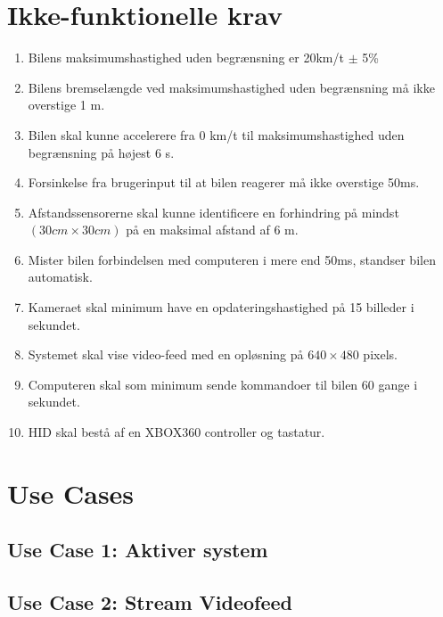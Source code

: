 \section{Ikke-funktionelle krav}
\begin{enumerate}
	\item Bilens maksimumshastighed uden begrænsning er 20km/t $\pm$ 5\% %
	\item Bilens bremselængde ved maksimumshastighed uden begrænsning må ikke overstige 1 m. %
	\item Bilen skal kunne accelerere fra 0 km/t til maksimumshastighed uden begrænsning på højest 6 s. %
	\item Forsinkelse fra brugerinput til at bilen reagerer må ikke overstige 50ms. %
	\item Afstandssensorerne skal kunne identificere en forhindring på mindst $(30cm \times 30cm)$ på en maksimal afstand af 6 m. %
	\item Mister bilen forbindelsen med computeren i mere end 50ms, standser bilen automatisk. 
	\item Kameraet skal minimum have en opdateringshastighed på 15 billeder i sekundet. %
	\item Systemet skal vise video-feed med en opløsning på $640 \times 480$ pixels.
	\item Computeren skal som minimum sende kommandoer til bilen 60 gange i sekundet. 
	\item HID skal bestå af en XBOX360 controller og tastatur.
\end{enumerate}

\newpage
\section{Use Cases}

\newpage
\subsection{Use Case 1: Aktiver system}


\newpage
\subsection{Use Case 2: Stream Videofeed}


